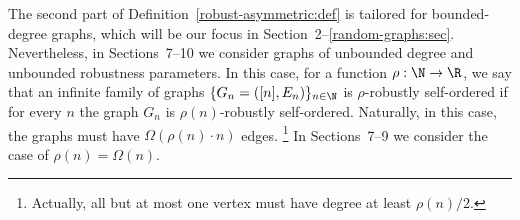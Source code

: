 The second part of Definition~\ref{robust-asymmetric:def}
is tailored for bounded-degree graphs, which will be our focus
in Section~2--\ref{random-graphs:sec}.
Nevertheless,
in Sections~7--10
we consider graphs
of unbounded degree and unbounded robustness parameters.
In this case, for a function $\rho:\N\to\R$,
we say that an infinite family of graphs $\{G_n=([n],E_n)\}_{n\in\N}$
is {\sf $\rho$-robustly self-ordered} if for every $n$
the graph $G_n$ is $\rho(n)$-robustly self-ordered.
Naturally, in this case, the graphs
must have $\Omega(\rho(n)\cdot n)$ edges.
\footnote{Actually, all but at most one vertex
must have degree at least $\rho(n)/2$.}
%
In Sections~7--9
we consider the case of $\rho(n)=\Omega(n)$.
























































































